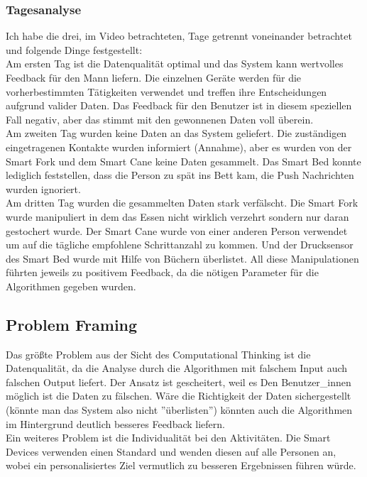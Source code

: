 \subsubsection{\textbf{Tagesanalyse}}
Ich habe die drei, im Video betrachteten, Tage getrennt voneinander betrachtet und folgende Dinge festgestellt: \\
Am ersten Tag ist die Datenqualität optimal und das System kann wertvolles Feedback für den Mann liefern. Die einzelnen Geräte werden für die vorherbestimmten Tätigkeiten verwendet und treffen ihre Entscheidungen aufgrund valider Daten. Das Feedback für den Benutzer ist in diesem speziellen Fall negativ, aber das stimmt mit den gewonnenen Daten voll überein. \\
Am zweiten Tag wurden keine Daten an das System geliefert. Die zuständigen eingetragenen Kontakte wurden informiert (Annahme), aber es wurden von der Smart Fork und dem Smart Cane keine Daten gesammelt. Das Smart Bed konnte lediglich feststellen, dass die Person zu spät ins Bett kam, die Push Nachrichten wurden ignoriert. \\
Am dritten Tag wurden die gesammelten Daten stark verfälscht. Die Smart Fork wurde manipuliert in dem das Essen nicht wirklich verzehrt sondern nur daran gestochert wurde. Der Smart Cane wurde von einer anderen Person verwendet um auf die tägliche empfohlene Schrittanzahl zu kommen. Und der Drucksensor des Smart Bed wurde mit Hilfe von Büchern überlistet. All diese Manipulationen führten jeweils zu positivem Feedback, da die nötigen Parameter für die Algorithmen gegeben wurden.\\

\subsection{Problem Framing}
Das größte Problem aus der Sicht des Computational Thinking ist die Datenqualität, da die Analyse durch die Algorithmen mit falschem Input auch falschen Output liefert. Der Ansatz ist gescheitert, weil es Den Benutzer\_innen möglich ist die Daten zu fälschen. Wäre die Richtigkeit der Daten sichergestellt (könnte man das System also nicht ''überlisten'') könnten auch die Algorithmen im Hintergrund deutlich besseres Feedback liefern. \\
Ein weiteres Problem ist die Individualität bei den Aktivitäten. Die Smart Devices verwenden einen Standard und wenden diesen auf alle Personen an, wobei ein personalisiertes Ziel vermutlich zu besseren Ergebnissen führen würde. 

